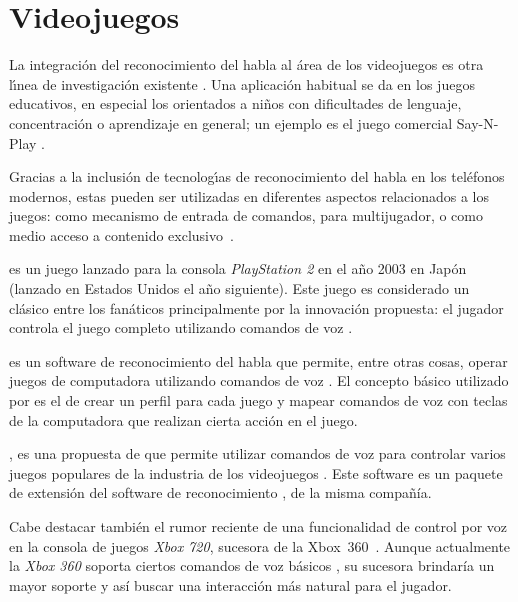 \section{Videojuegos}
\label{sec:videojuegos}

La integraci\'on del reconocimiento del habla al \'area de los videojuegos es otra l{\'\i}nea de
investigaci\'on existente \cite{SporkaNonSpeech2006, JanickiAutomatic2011}. 
Una aplicaci\'on habitual se da en los juegos educativos, en especial los orientados a ni\~nos 
con dificultades de lenguaje, concentraci\'on o aprendizaje en general; un ejemplo es el juego
comercial Say-N-Play \cite{SayNPlay}.

Gracias a la inclusi\'on de tecnolog{\'\i}as de reconocimiento del habla en los tel\'efonos modernos,
estas pueden ser utilizadas en diferentes aspectos relacionados a los juegos: como mecanismo de entrada 
de comandos, para  multijugador, o como medio acceso a contenido 
\mbox{exclusivo \cite{JoselliMobile2009}}.

 es un juego lanzado para la consola \emph{PlayStation 2} en el a\~no 2003 en Jap\'on (lanzado en Estados Unidos
el a\~no siguiente). Este
juego es considerado un cl\'asico entre los fan\'aticos principalmente por la innovaci\'on propuesta: el jugador controla 
el juego completo utilizando comandos de voz \cite{Lifeline}.

 es un software de reconocimiento del habla que permite, entre otras cosas, operar juegos de computadora
utilizando comandos de voz \cite{tazti}. El concepto b\'asico utilizado por  es el de crear un perfil para
cada juego y mapear comandos de voz con teclas de la computadora que realizan cierta acci\'on en el juego.

, es una propuesta de  que permite utilizar comandos de
voz para controlar varios juegos populares de la industria de los videojuegos \cite{DragonGamingSpeech}. Este software
es un paquete de extensi\'on del software de reconocimiento , de la misma compa\~n\'ia.

Cabe destacar tambi\'en el rumor reciente de una funcionalidad de control por voz en
la consola de juegos \emph{Xbox 720}, sucesora de la \mbox{Xbox 360 \cite{IgnXbox}}. Aunque actualmente la \emph{Xbox 360}
soporta ciertos comandos de voz b\'asicos \cite{KinectVoice}, su sucesora brindar\'ia un mayor soporte y as\'i buscar
una interacci\'on m\'as natural para el jugador.
